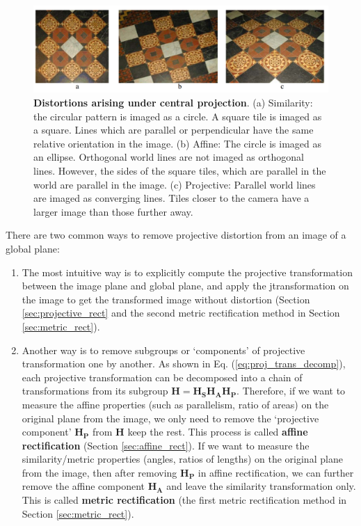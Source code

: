 \documentclass[12pt]{article}
\numberwithin{equation}{section}
\begin{document}
\begin{figure}[h]
\begin{center}
\includegraphics[width=1.0\textwidth]{central_proj_example.png}
\end{center}
\caption{\textbf{Distortions arising under central projection}. (a) Similarity: the
circular pattern is imaged as a circle. A square tile is imaged as a square. Lines which are parallel or perpendicular have the same relative orientation in the image. (b) Affine: The circle is imaged as an ellipse. Orthogonal world lines are not imaged as orthogonal lines. However, the sides of the square tiles, which are parallel in the world are parallel in the image. (c) Projective: Parallel world lines are imaged as converging lines. Tiles closer to the camera have a larger image than those further away.}
\label{fig:proj_distortion}
\end{figure}

There are two common ways to remove projective distortion from an image of a global plane:

\begin{enumerate}
\item The most intuitive way is to explicitly compute the projective transformation between the image plane and global plane, and apply the jtransformation on the image to get the transformed image without distortion (Section \ref{sec:projective_rect} and the second metric rectification method in Section \ref{sec:metric_rect}).
\item Another way is to remove subgroups or `components' of projective transformation one by another. As shown in Eq. (\ref{eq:proj_trans_decomp}), each projective transformation can be decomposed into a chain of transformations from its subgroup $\mathbf{H = H_S H_A H_P}$. Therefore, if we want to measure the affine properties (such as parallelism, ratio of areas) on the original plane from the image, we only need to remove the `projective component' $\mathbf{H_P}$ from $\mathbf{H}$ keep the rest. This process is called \textbf{affine rectification} (Section \ref{sec:affine_rect}). If we want to measure the similarity/metric properties (angles, ratios of lengths) on the original plane from the image, then after removing $\mathbf{H_P}$ in affine rectification, we can further remove the affine component $\mathbf{H_A}$ and leave the similarity transformation only. This is called \textbf{metric rectification} (the first metric rectification method in Section \ref{sec:metric_rect}).
\end{enumerate}
\end{document}
